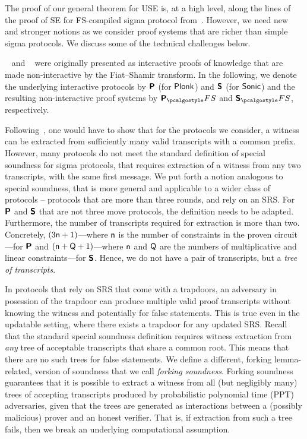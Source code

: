The proof of our general theorem for USE is, at a high level, along the lines of the proof of SE for FS-compiled sigma protocol
from~\cite{INDOCRYPT:FKMV12}. However, we need new and stronger notions as we consider proof systems that are
richer than simple sigma protocols. We discuss some of the technical challenges below.

\plonk~\cite{EPRINT:GabWilCio19} and \sonic~\cite{CCS:MBKM19} were originally presented
as interactive proofs of knowledge that are made non-interactive by the Fiat--Shamir transform. In the following,
we denote the underlying interactive protocols by $\bm{\mathsf{P}}$ (for $\textnormal{\textsf{Plonk}}$)
and $\bm{\mathsf{S}}$ (for ${\textnormal{\textsf{Sonic}}}$) and the resulting non-interactive proof systems by
$\plonkprotfs$ and $\sonicprotfs$, respectively.

Following~\cite{INDOCRYPT:FKMV12}, one would have to show that for the protocols we consider, a witness can be extracted from sufficiently many valid transcripts with a common prefix. However, many protocols
do not meet the standard definition of special soundness for sigma protocols, that requires extraction of a witness from any two transcripts, with the same first message. We put forth a notion analogous to special soundness, that is more general and applicable to a wider class of protocols -- protocols that are more than three rounds, and rely on an SRS. For $\bm{\mathsf{P}}$ and
$\bm{\mathsf{S}}$ that are not three move protocols, the definition needs to be adapted. Furthermore, the number of transcripts
required for extraction is more than two. Concretely, $(3 \mathsf{n} + 1)$---where $\mathsf{n}$ is the
number of constraints in the proven circuit---for $\bm{\mathsf{P}}$ and
$(\mathsf{n} + \mathsf{Q} + 1)$---where $\mathsf{n}$ and $\mathsf{Q}$ are the
numbers of multiplicative and linear constraints---for $\bm{\mathsf{S}}$. Hence, we
do not have a pair of transcripts, but a \emph{tree of transcripts}.

In protocols that rely on SRS that come with a
trapdoors, an adversary in posession of the trapdoor can produce multiple
valid proof transcripts without knowing the witness and potentially for false
statements. This is true even in the updatable setting, where there exists a trapdoor for any updated SRS.
Recall that the standard special soundness definition requires
witness extraction from \emph{any} tree of acceptable transcripts that share a
common root. This means that there are no such trees for false
statements. We define a different, forking lemma-related, version
of soundness that we call \emph{forking soundness}. Forking soundness guarantees that it is
possible to extract a witness from all (but negligibly many) trees of accepting
transcripts produced by probabilistic polynomial time (PPT) adversaries, given
that the trees are generated as interactions between a (possibly malicious)
prover and an honest verifier. That is, if extraction from such a tree fails, then we break an
underlying computational assumption.

